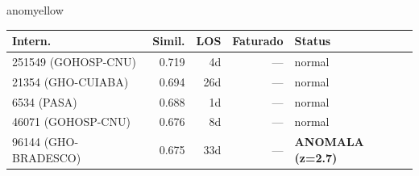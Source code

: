 \documentclass[a4paper,10pt]{article}
\begin{document}
\begin{anomalycard}[Internacao 167444 | GHO-PETROBRAS | MODERADO (z=2.03)]{anomyellow}
\begin{tabular}{l r r r l}\toprule\textbf{Intern.} & \textbf{Simil.} & \textbf{LOS} & \textbf{Faturado} & \textbf{Status} \\\midrule
251549 (GOHOSP-CNU) & 0.719 & 4d & --- & \textcolor{jcubeblue}{normal} \\
21354 (GHO-CUIABA) & 0.694 & 26d & --- & \textcolor{jcubeblue}{normal} \\
6534 (PASA) & 0.688 & 1d & --- & \textcolor{jcubeblue}{normal} \\
46071 (GOHOSP-CNU) & 0.676 & 8d & --- & \textcolor{jcubeblue}{normal} \\
96144 (GHO-BRADESCO) & 0.675 & 33d & --- & \textcolor{anomred}{\textbf{ANOMALA (z=2.7)}} \\
\bottomrule\end{tabular}


\end{anomalycard}

\newpage
\end{document}
